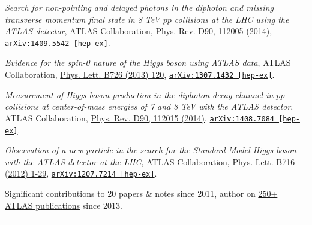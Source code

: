 \documentclass{letter}
\begin{document}
\textit{Search for non-pointing and delayed photons in the diphoton and missing transverse momentum final state in 8 TeV $pp$ collisions at the LHC using the ATLAS detector}, ATLAS Collaboration, 
\href{http://journals.aps.org/prd/abstract/10.1103/PhysRevD.90.112005}{Phys. Rev. D90, 112005 (2014)}, \href{https://arxiv.org/abs/1409.5542}{\texttt{arXiv:1409.5542 [hep-ex]}}.

\textit{Evidence for the spin-0 nature of the Higgs boson using ATLAS data}, ATLAS Collaboration, \href{http://www.sciencedirect.com/science/article/pii/S0370269313006527?np=y}{Phys. Lett. B726 (2013) 120}, \href{https://arxiv.org/abs/1307.1432}{\texttt{arXiv:1307.1432 [hep-ex]}}.

\textit{Measurement of Higgs boson production in the diphoton decay channel in $pp$ collisions at center-of-mass energies of 7 and 8 TeV with the ATLAS detector}, ATLAS Collaboration, \href{http://journals.aps.org/prd/abstract/10.1103/PhysRevD.90.112015}{Phys. Rev. D90, 112015 (2014)}, \href{http://arxiv.org/abs/1408.7084}{\texttt{arXiv:1408.7084 [hep-ex]}}.

\textit{Observation of a new particle in the search for the Standard Model Higgs boson with the ATLAS detector at the LHC}, ATLAS Collaboration, \href{http://www.sciencedirect.com/science/article/pii/S037026931200857X}{Phys. Lett. B716 (2012) 1-29}, \href{https://arxiv.org/abs/1207.7214}{\texttt{arXiv:1207.7214 [hep-ex]}}.

\begin{flushright}
Significant contributions to 20 papers \& notes since 2011, author on \href{https://twiki.cern.ch/twiki/bin/view/AtlasPublic}{250+ ATLAS publications} since 2013.\\
\end{flushright}

\begin{flushleft}
\Large{\textsc{\textbf{\color{Maroon}{Conference Presentations}}}}
\vspace{1pt} %
\hrule
\end{flushleft}
\end{document}
